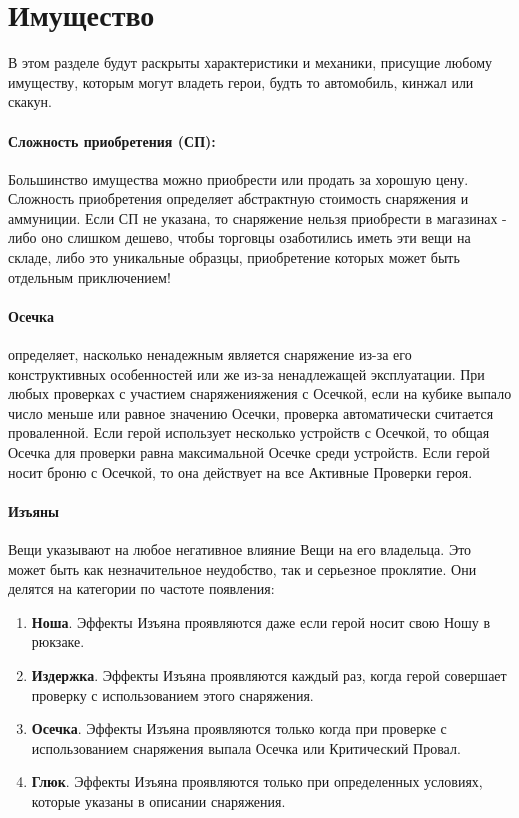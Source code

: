 \section{Имущество}
В этом разделе будут раскрыты характеристики и механики, присущие любому имуществу, которым могут владеть герои, будть то автомобиль, кинжал или скакун.

\paragraph{Сложность приобретения (СП):} Большинство имущества можно приобрести или продать за хорошую цену. Сложность приобретения определяет абстрактную стоимость снаряжения и аммуниции. Если СП не указана, то снаряжение нельзя приобрести в магазинах - либо оно слишком дешево, чтобы торговцы озаботились иметь эти вещи на складе, либо это уникальные образцы, приобретение которых может быть отдельным приключением!

\paragraph{Осечка} определяет, насколько ненадежным является снаряжение из-за его конструктивных особенностей или же из-за ненадлежащей эксплуатации. При любых проверках с участием снаряженияжения с Осечкой, если на кубике выпало число меньше или равное значению Осечки, проверка автоматически считается проваленной. Если герой использует несколько устройств с Осечкой, то общая Осечка для проверки равна максимальной Осечке среди устройств.
\newline Если герой носит броню с Осечкой, то она действует на все Активные Проверки героя.

\paragraph{Изъяны} Вещи указывают на любое негативное влияние Вещи на его владельца. Это может быть как незначительное неудобство, так и серьезное проклятие. Они делятся на категории по частоте появления:
\begin{enumerate}
\item \textbf{Ноша}. Эффекты Изъяна проявляются даже если герой носит свою Ношу в рюкзаке.
\item \textbf{Издержка}. Эффекты Изъяна проявляются каждый раз, когда герой совершает проверку с использованием этого снаряжения.
\item \textbf{Осечка}. Эффекты Изъяна проявляются только когда при проверке с использованием снаряжения выпала Осечка или Критический Провал.
\item \textbf{Глюк}. Эффекты Изъяна проявляются только при определенных условиях, которые указаны в описании снаряжения.
\end{enumerate}

